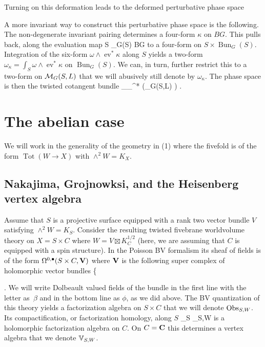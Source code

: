 \documentclass[11pt]{amsart}
\renewcommand{\op}{\operatorname}
\begin{document}
Turning on this deformation leads to the deformed perturbative phase space
\beqn
{}
\eeqn
A more invariant way to construct this perturbative phase space is the following.
The non-degenerate invariant pairing determines a four-form $\kappa$ on $BG$.
This pulls back, along the evaluation map
\beqn
\op{ev} \colon S \times \op{Bun}_G(S) \to BG 
\eeqn
to a four-form on $S \times \op{Bun}_G(S)$.
Integration of the six-form $\omega \wedge \op{ev}^*\kappa$ along $S$ yields a two-form $\omega_{\kappa} = \int_S \omega \wedge \op{ev}^*\kappa$ on $\op{Bun}_G(S)$.
We can, in turn, further restrict this to a two-form on $\mathcal M_{G}(S,L)$ that we will abusively still denote by $\omega_{\kappa}$.
The phase space is then the twisted cotangent bundle
\beqn
\T_{\omega_{\kappa}}^* \left(\cM_{G}(S,L) \right) .
\eeqn

\section{The abelian case}

We will work in the generality of the geometry in (1) where the fivefold is of the form $\op{Tot}(W \to X)$ with $\wedge^2 W = K_X$.

\subsection{Nakajima, Grojnowksi, and the Heisenberg vertex algebra}

Assume that $S$ is a projective surface equipped with a rank two vector bundle $V$ satisfying $\wedge^2 W = K_S$.
Consider the resulting twisted fivebrane worldvolume theory on $X = S \times C$ where $W = V \boxtimes K_C^{1/2}$ (here, we are assuming that $C$ is equipped with a spin structure).
In the Poisson BV formalism its sheaf of fields is of the form $\Omega^{0,\bullet}(S \times C,\mathbf V)$ where $\mathbf V$ is the following super complex of holomorphic vector bundles
\beqn
\bV \colon \;\;\;\left\{
 \right.
\eeqn
We will write Dolbeault valued fields of the bundle in the first line with the letter as~$\beta$ and in the bottom line as $\phi$, as we did above.
The BV quantization of this theory yields a factorization algebra on $S \times C$ that we will denote ${\rm Obs}_{S,W}$.
Its compactification, or factorization homology, along $S$
\beqn
\int_S \Obs_{S,W} 
\eeqn
is a holomorphic factorization algebra on $C$.
On $C = \mathbf{C}$ this determines a vertex algebra that we denote $\mathbb V_{S,W}$.
\end{document}
